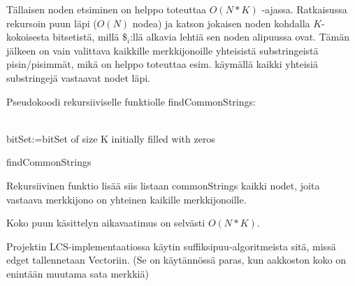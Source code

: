 \documentclass{article}
\begin{document}
    Tällaisen noden etsiminen on helppo toteuttaa $O(N*K)$ -ajassa. Ratkaisussa rekursoin puun läpi ($O(N)$ nodea) ja katson 
    jokaisen noden kohdalla $K$-kokoisesta bitsetistä, millä $\$_i$:llä alkavia lehtiä sen noden alipuussa ovat. Tämän jälkeen
    on vain valittava kaikkille merkkijonoille yhteisistä substringeistä pisin/pisimmät, mikä on helppo toteuttaa esim. käymällä
    kaikki yhteisiä substringejä vastaavat nodet läpi.
    
    \newpage
    
    Pseudokoodi rekursiiviselle funktiolle findCommonStrings:
    \\ \\
    \begin{algorithm}[H]
        bitSet:=bitSet of size K initially filled with zeros\;
        \caption{findCommonStrings}
    \end{algorithm}

    \medskip \medskip
    Rekursiivinen funktio lisää siis listaan commonStrings kaikki nodet, joita vastaava merkkijono on yhteinen kaikille merkkijonoille.
    
    Koko puun käsittelyn aikavaatimus on selvästi $O(N*K)$.
    
    Projektin LCS-implementaatiossa käytin suffiksipuu-algoritmeista sitä, missä edget tallennetaan Vectoriin. (Se on käytännössä paras,
    kun aakkoston koko on enintään muutama sata merkkiä)
    
    
\end{document}
